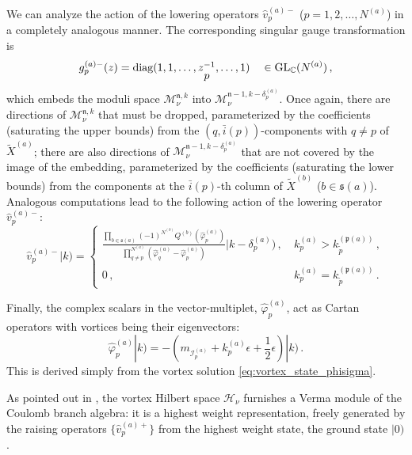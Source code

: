 \documentclass[12pt,a4paper]{article}
\newcommand{\nn}{\mathfrak{n}}
\renewcommand{\(}{\left(}
\renewcommand{\)}{\right)}
\renewcommand{\(}{\left(}
\renewcommand{\)}{\right)}
\begin{document}
We can analyze the action of the lowering operators $\hat{v}^{(a)-}_p$ ($p=1,2,\dots,N^{(a)}$) in a completely analogous manner. 
The corresponding singular gauge transformation is
\begin{equation}
g^{(a)-}_{p}(z)=\textrm{diag}(1,1,\dots, \stackunder{$z^{-1}$}{$p$},\dots,1)\quad \in \text{GL}_{\mathbb{C}}(N^{(a)})\,,
\end{equation}
which embeds the moduli space $\mathcal{M}^{\nn,k}_\nu$ into $\mathcal{M}_\nu^{\nn-1,k-\delta^{(a)}_{p}}$.
Once again, there are directions of $\mathcal{M}^{\nn,k}_\nu$ that must be dropped, parameterized by the coefficients (saturating the upper bounds) from the $(q,\bar{i}(p))$-components with $q\neq p$ of $\tilde{X}^{(a)}$; there are also directions of  $\mathcal{M}_\nu^{\nn-1,k-\delta^{(a)}_{p}}$ that are not covered by the image of the embedding, parameterized by the coefficients (saturating the lower bounds) from the components at the $\bar{i}(p)$-th column of $\tilde{X}^{(b)}$ ($b\in\mathfrak{s}(a)$). 
Analogous computations lead to the following action of the lowering operator $\hat{v}^{(a)-}_{p}$:
\begin{equation}\label{eq:v-_action}
\hat{v}^{(a)-}_{p}|k)=
\left\{
\begin{array}{cl}
\frac{\prod_{b\in \mathfrak{s}(a)}(-1)^{N^{(b)}} Q^{(b)}(\hat{\varphi}^{(a)}_p)}{\prod_{q\neq p}^{N^{(a)}}(\hat{\varphi}^{(a)}_q-\hat{\varphi}^{(a)}_p)}
|k-\delta^{(a)}_{p})\,, \ & k^{(a)}_p>k^{(\mathfrak{p}(a))}_{\tilde{p}}\,, \\
0\,, & k^{(a)}_p=k^{(\mathfrak{p}(a))}_{\tilde{p}}\,.
\end{array}\right.
\end{equation}


Finally, the complex scalars in the vector-multiplet, $\hat{\varphi}^{(a)}_p$, act  as Cartan operators with vortices being their eigenvectors:
\begin{equation}\label{eq:varphi_action}
\hat{\varphi}^{(a)}_{p} |k)=-(m_{\mathcal{I}^{(a)}_{p}}+k^{(a)}_{p}\epsilon+\frac{1}{2}\epsilon)|k)\,.
\end{equation}
This is derived simply from the vortex solution \eqref{eq:vortex_state_phisigma}.





As pointed out in \cite[Sec.~4]{Bullimore:2016hdc}, the vortex Hilbert space $\mathcal{H}_\nu$ furnishes a Verma module of the Coulomb branch algebra: it is a highest weight representation, freely generated by the raising operators $\{\hat{v}^{(a)+}_p\}$ from the highest weight state, the ground state $|0)$.
\end{document}
